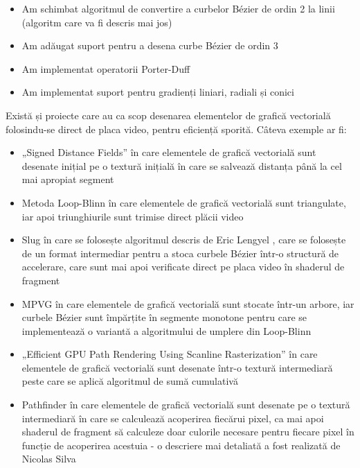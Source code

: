 \documentclass[a4paper, 12pt]{report}
\begin{document}
\begin{itemize}
    \item{Am schimbat algoritmul de convertire a curbelor Bézier de ordin 2 la linii (algoritm care va fi descris mai jos)}
    \item{Am adăugat suport pentru a desena curbe Bézier de ordin 3}
    \item{Am implementat operatorii Porter-Duff \cite{Porter-Duff}}
    \item{Am implementat suport pentru gradienți liniari, radiali și conici}
\end{itemize}

Există și proiecte care au ca scop desenarea elementelor de grafică vectorială folosindu-se direct de placa video, pentru
eficiență sporită. Câteva exemple ar fi:

\begin{itemize}
    \item{„Signed Distance Fields” \cite{SDF_valve_paper} în care elementele de grafică vectorială sunt desenate inițial pe
                o textură inițială în care se salvează distanța până la cel mai apropiat segment}
    \item{Metoda Loop-Blinn \cite{Loop-Blinn_algorithm} în care elementele de grafică vectorială sunt triangulate, iar apoi
                triunghiurile sunt trimise direct plăcii video}
    \item{Slug \cite{Slug_library} în care se folosește algoritmul descris de Eric Lengyel \cite{Slug_paper}, care se folosește
                de un format intermediar pentru a stoca curbele Bézier într-o structură de accelerare, care sunt mai apoi verificate
                direct pe placa video în shaderul de fragment}
    \item{MPVG \cite{MPVG_paper} în care elementele de grafică vectorială sunt stocate într-un arbore, iar curbele Bézier sunt
                împărțite în segmente monotone pentru care se implementează o variantă a algoritmului de umplere din Loop-Blinn}
    \item{„Efficient GPU Path Rendering Using Scanline Rasterization” \cite{GPU_Scanline_paper} în care elementele de grafică
                vectorială sunt desenate într-o textură intermediară peste care se aplică algoritmul de sumă cumulativă}
    \item{Pathfinder \cite{pathfinder_library} în care elementele de grafică vectorială sunt desenate pe o textură intermediară
                în care se calculează acoperirea fiecărui pixel, ca mai apoi shaderul de fragment să calculeze doar culorile necesare pentru
                fiecare pixel în funcție de acoperirea acestuia - o descriere mai detaliată a fost realizată de Nicolas Silva \cite{pathfinder_algorithm}}
\end{itemize}
\end{document}
